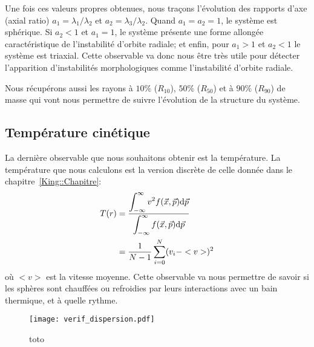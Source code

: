 			Une fois ces valeurs propres obtenues, nous traçons l'évolution des rapports d'axe (\og axial ratio\fg)
			$a_1 = \lambda_1 / \lambda_2$ et $a_2 = \lambda_3 / \lambda_2$. Quand $a_1 = a_2 = 1$, le
			système est sphérique. Si $a_2 < 1$ et $a_1 = 1$, le système présente une forme allongée
			caractéristique de l'instabilité d'orbite radiale; et enfin, pour $a_1 >
			1$ et $a_2 < 1$ le système est triaxial. Cette observable va donc nous être très utile pour
			détecter l'apparition d'instabilités morphologiques comme l'instabilité d'orbite radiale.

			Nous récupérons aussi les rayons à $10\%$ ($R_{10}$), $50\%$ ($R_{50}$) et à $90\%$ ($R_{90}$) de masse qui vont nous
			permettre de suivre l'évolution de la structure du système.

		\subsection{Température cinétique}

			La dernière observable que nous souhaitons obtenir est la température. La température que nous
			calculons est la version discrète de celle donnée dans le chapitre~\ref{King::Chapitre}:
			\begin{align}
				T(r) &= \dfrac{\displaystyle\int_{-\infty}^{\infty}v^2 f(\vec{x}, \vec{p})\mathrm{d}\vec{p}}{\displaystyle\int_{-\infty}^{\infty}f(\vec{x}, \vec{p})\mathrm{d}\vec{p}} \\
				     &= \dfrac{1}{N-1}\sum_{i=0}^N (v_i - <v>)^2
			\end{align}
			où $<v>$ est la vitesse moyenne.
			Cette observable va nous permettre de savoir si les sphères sont chauffées ou refroidies par leurs
			interactions avec un bain thermique, et à quelle rythme.

			\begin{figure}[h]
				\centering \texttt{[image: verif\_dispersion.pdf]}
				\caption{toto}
			\end{figure}

